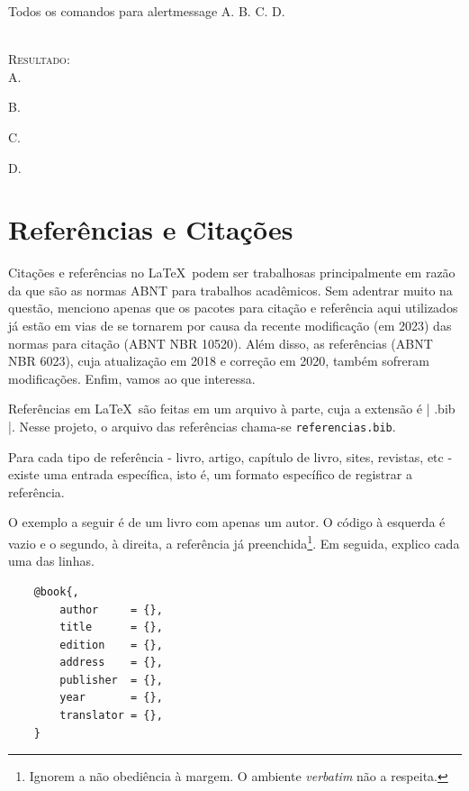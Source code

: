 \documentclass[a4paper,12pt,oneside,openright,extrafontsizes,openbib]{memoir}
\begin{document}
{\begin{codex}{Todos os comandos para alertmessage}
	A. 
	B. 
	C. 
	D. 
\end{codex}
\ \\

\textsc{Resultado:}
\ \\

A. 

B. 

C. 

D. 


\chapter{Referências e Citações}

Citações e referências no \LaTeX\ podem ser trabalhosas principalmente em razão da  que são as normas ABNT para trabalhos acadêmicos. Sem adentrar muito na questão, menciono apenas que os pacotes para citação e referência aqui utilizados já estão em vias de se tornarem  por causa da recente modificação (em 2023) das normas para citação (ABNT NBR 10520). Além disso, as referências (ABNT NBR 6023), cuja atualização em 2018 e correção em 2020, também sofreram modificações. Enfim, vamos ao que interessa.

Referências em \LaTeX\ são feitas em um arquivo à parte, cuja a extensão é | .bib |. Nesse projeto, o arquivo das referências chama-se \verb|referencias.bib|.

Para cada tipo de referência - livro, artigo, capítulo de livro, sites, revistas, etc - existe uma entrada específica, isto é, um formato específico de registrar a referência.

O exemplo a seguir é de um livro com apenas um autor. O código à esquerda é vazio e o segundo, à direita, a referência já preenchida\footnote{Ignorem a não obediência à margem. O ambiente \textit{verbatim} não a respeita.}. Em seguida, explico cada uma das linhas.

\begin{multicols}{2}
\begin{verbatim}
	@book{, 
		author     = {},
		title      = {},
		edition    = {},
		address    = {},
		publisher  = {},
		year       = {},
		translator = {},
	}
\end{verbatim}


\end{multicols}}
\end{document}
